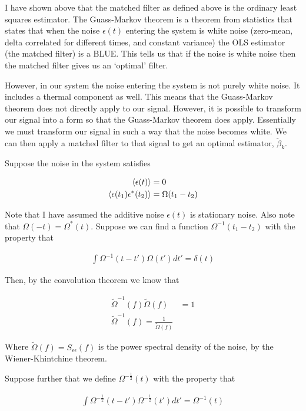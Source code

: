 \documentclass[12pt]{article}
\begin{document}
I have shown above that the matched filter as defined above is the ordinary least squares estimator. The Guass-Markov theorem is a theorem from statistics that states that when the noise $\epsilon(t)$ entering the system is white noise (zero-mean, delta correlated for different times, and constant variance) the OLS estimator (the matched filter) is a BLUE. This tells us that if the noise is white noise then the matched filter gives us an `optimal' filter.

However, in our system the noise entering the system is not purely white noise. It includes a thermal component as well. This means that the Guass-Markov theorem does not directly apply to our signal. However, it is possible to transform our signal into a form so that the Guass-Markov theorem does apply. Essentially we must transform our signal in such a way that the noise becomes white. We can then apply a matched filter to that signal to get an optimal estimator, $\check{\beta}_k$.

Suppose the noise in the system satisfies

\begin{align}
\Braket{\epsilon(t)} &= 0\\
\Braket{\epsilon(t_1)\epsilon^*(t_2)} &= \Omega(t_1-t_2)
\end{align}

Note that I have assumed the additive noise $\epsilon(t)$ is stationary noise. Also note that $\Omega(-t) = \Omega^*(t)$.
Suppose we can find a function $\Omega^{-1}(t_1-t_2)$ with the property that

\begin{align}
\int \Omega^{-1}(t-t')\Omega(t') dt' = \delta(t)
\end{align}

Then, by the convolution theorem we know that

\begin{align}
\tilde{\Omega}^{-1}(f) \tilde{\Omega}(f) & = 1\\
\tilde{\Omega}^{-1}(f) = \frac{1}{\tilde{\Omega}(f)}
\end{align}

Where $\tilde{\Omega}(f) = S_{\epsilon \epsilon}(f)$ is the power spectral density of the noise, by the Wiener-Khintchine theorem.

Suppose further that we define $\Omega^{-\frac{1}{2}}(t)$ with the property that

\begin{align}
\int \Omega^{-\frac{1}{2}}(t-t') \Omega^{-\frac{1}{2}}(t') dt' = \Omega^{-1}(t)
\end{align}
\end{document}
